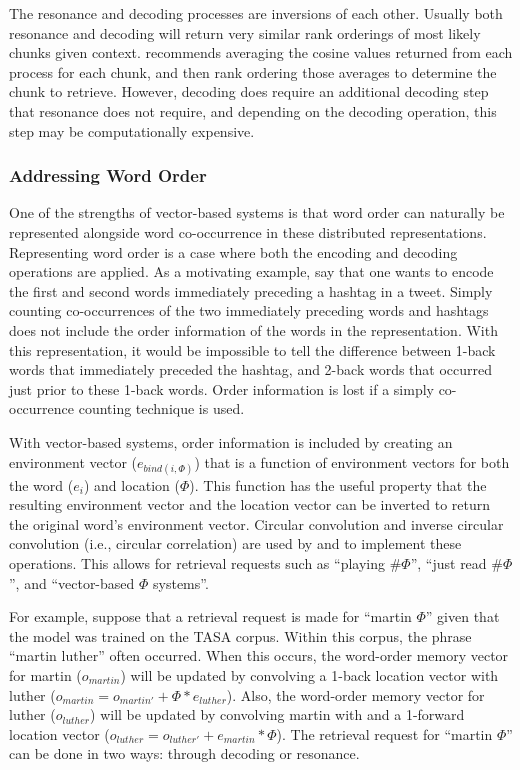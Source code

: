 \documentclass[man,floatsintext,donotrepeattitle]{apa6}
\begin{document}
The resonance and decoding processes are inversions of each other.
Usually both resonance and decoding will return very similar rank orderings of most likely chunks given context.
\textcite{Jones2007} recommends averaging the cosine values returned from each process for each chunk, and then rank ordering those averages to determine the chunk to retrieve.
However, decoding does require an additional decoding step that resonance does not require, and depending on the decoding operation, this step may be computationally expensive.

\subsubsection{Addressing Word Order}

One of the strengths of vector-based systems is that word order can naturally be represented alongside word co-occurrence in these distributed representations.
Representing word order is a case where both the encoding and decoding operations are applied.
As a motivating example, say that one wants to encode the first and second words immediately preceding a hashtag in a tweet.
Simply counting co-occurrences of the two immediately preceding words and hashtags does not include the order information of the words in the representation.
With this representation, it would be impossible to tell the difference between 1-back words that immediately preceded the hashtag, and 2-back words that occurred just prior to these 1-back words.
Order information is lost if a simply co-occurrence counting technique is used.

With vector-based systems, order information is included by creating an environment vector ($e_{bind(i,\Phi)}$) that is a function of environment vectors for both the word ($e_{i}$) and location ($\Phi$).
This function has the useful property that the resulting environment vector and the location vector can be inverted to return the original word's environment vector.
Circular convolution and inverse circular convolution (i.e., circular correlation) are used by \textcite{Plate1995} and \textcite{Jones2007} to implement these operations.
This allows for retrieval requests such as ``playing \#$\Phi$'', ``just read \#$\Phi$'', and ``vector-based $\Phi$ systems''.

For example, suppose that a retrieval request is made for ``martin $\Phi$'' given that the model was trained on the TASA corpus.
Within this corpus, the phrase ``martin luther'' often occurred.
When this occurs, the word-order memory vector for martin ($o_{martin}$) will be updated by convolving a 1-back location vector with luther ($o_{martin} = o_{martin'} + \Phi * e_{luther}$).
Also, the word-order memory vector for luther ($o_{luther}$) will be updated by convolving martin with and a 1-forward location vector ($o_{luther} = o_{luther'} + e_{martin} * \Phi$).
The retrieval request for ``martin $\Phi$'' can be done in two ways: through decoding or resonance.
\end{document}
